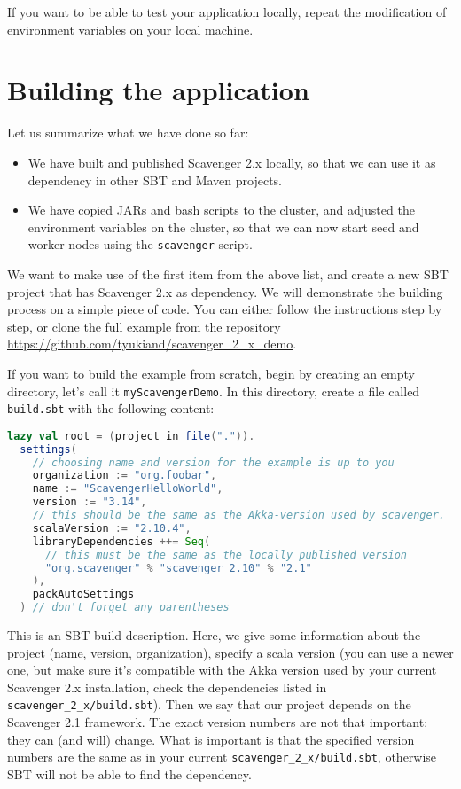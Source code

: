 \documentclass{scrbook}
\begin{document}
If you want to be able to test your application locally, 
repeat the modification of environment variables on your local 
machine.

\section{Building the application}
Let us summarize what we have done so far:
\begin{itemize}
  \item We have built and published Scavenger 2.x locally, so 
    that we can use it as dependency in other SBT and Maven 
    projects.
  \item We have copied JARs and bash scripts to the cluster,
    and adjusted the environment variables on the 
    cluster, so that we can now start seed and worker nodes
    using the \lstinline{scavenger} script.
\end{itemize}
We want to make use of the first item from the above list, 
and create a new SBT project that has Scavenger 2.x 
as dependency. We will demonstrate the building process on
a simple piece of code.
You can either follow the instructions step by step, or 
clone the full example from the repository
\url{https://github.com/tyukiand/scavenger_2_x_demo}.

If you want to build the example from scratch, 
begin by creating an empty directory, let's call it 
\lstinline{myScavengerDemo}.
In this directory, create a file called \lstinline{build.sbt}
with the following content:
\begin{lstlisting}[language=scala]
lazy val root = (project in file(".")).
  settings(
    // choosing name and version for the example is up to you
    organization := "org.foobar", 
    name := "ScavengerHelloWorld",
    version := "3.14", 
    // this should be the same as the Akka-version used by scavenger.
    scalaVersion := "2.10.4", 
    libraryDependencies ++= Seq(
      // this must be the same as the locally published version
      "org.scavenger" % "scavenger_2.10" % "2.1" 
    ),
    packAutoSettings
  ) // don't forget any parentheses
\end{lstlisting}
This is an SBT build description. Here, we give some information about the
project (name, version, organization), specify a scala version (you can 
use a newer one, but make sure it's compatible with the Akka version used
by your current Scavenger 2.x installation, check the dependencies listed
in \lstinline{scavenger_2_x/build.sbt}). Then we say that our project 
depends on the Scavenger 2.1 framework. The exact version numbers are not
that important: they can (and will) change. What is important is that 
the specified version numbers are the same as in your current
\lstinline{scavenger_2_x/build.sbt}, otherwise SBT will not be able 
to find the dependency.
\end{document}
